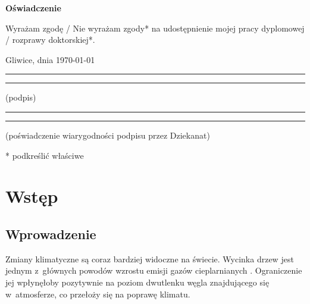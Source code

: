 \documentclass[a4paper,12pt, twoside]{article}
\begin{document}
        \vfill  

        \begin{center}
        	\Large\bfseries Oświadczenie
        \end{center}
        
        \vfill
        
        Wyrażam  zgodę / Nie wyrażam zgody*  na  udostępnienie  mojej  pracy  dyplomowej / rozprawy doktorskiej*.
        
        \vfill
        
        Gliwice, dnia \today
        
        \vfill
        
        \rule{0.5\textwidth}{0cm}\dotfill 
        
        \rule{0.5\textwidth}{0cm}
        \begin{minipage}{0.45\textwidth}
        	{\begin{center}(podpis)\end{center}}
        \end{minipage} 
        
        \vfill
        
        \rule{0.5\textwidth}{0cm}\dotfill 
        
        \rule{0.5\textwidth}{0cm}
        \begin{minipage}{0.45\textwidth}
	        {\begin{center}\rule{0mm}{5mm}(poświadczenie wiarygodności podpisu przez Dziekanat)\end{center}}
        \end{minipage}
        \vfill
        * podkreślić właściwe
        
        \leavevmode\thispagestyle{empty}\newpage
        \leavevmode\thispagestyle{empty}\newpage
    	\thispagestyle{empty}
    	\tableofcontents
    	\newpage
    	\leavevmode\thispagestyle{empty}\newpage
    	\newpage
    	\clearpage
    	\setcounter{page}{1}
    	
    	\section{Wstęp}
    	
    	\subsection{Wprowadzenie}
    	Zmiany klimatyczne są coraz bardziej widoczne na świecie. Wycinka drzew jest jednym z~głównych powodów wzrostu emisji gazów cieplarnianych \cite{clima_causes}. Ograniczenie jej wpłynęłoby pozytywnie na poziom dwutlenku węgla znajdującego się w~atmosferze, co przełoży się na poprawę klimatu. 
    	
\end{document}
